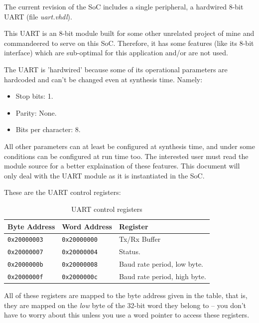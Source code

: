     The current revision of the SoC includes a single peripheral, a hardwired 
    8-bit UART (file \emph{uart.vhdl}).
    
    This UART is an 8-bit module built for some other unrelated project of mine
    and commandeered to serve on this SoC. Therefore, it has some features
    (like its 8-bit interface) which are sub-optimal for this application and/or
    are not used.
    
    The UART is 'hardwired' because some of its operational parameters are 
    hardcoded and can't be changed even at synthesis time. Namely:
    
    \begin{itemize}
    \item Stop bits: 1.
    \item Parity: None.
    \item Bits per character: 8.
    \end{itemize}
    
    All other parameters can at least be configured at synthesis time, and 
    under some conditions can be configured at run time too. The interested 
    user must read the module source for a better explaination of these 
    features. This document will only deal with the UART module as it is 
    instantiated in the SoC.
    
    
    These are the UART control registers:
    
    \begin{table}[h]
    \caption{UART control registers\label{uart_control_regs}}
    \begin{tabularx}{\textwidth}{ ll|X }
    \toprule
    Byte Address & Word Address & Register \\
    \midrule
    \texttt{0x20000003}   & \texttt{0x20000000} & Tx/Rx Buffer \\
    \texttt{0x20000007}   & \texttt{0x20000004} & Status. \\
    \texttt{0x2000000b}   & \texttt{0x20000008} & Baud rate period, low byte. \\
    \texttt{0x2000000f}   & \texttt{0x2000000c} & Baud rate period, high byte. \\
    \bottomrule
    \end{tabularx}
    \end{table} 
    
    
    All of these registers are mapped to the byte address given in the table,
    that is, they are mapped on the \emph{low} byte of the 32-bit word they 
    belong to -- you don't have to worry about this unless you use a word 
    pointer to access these registers.
    
